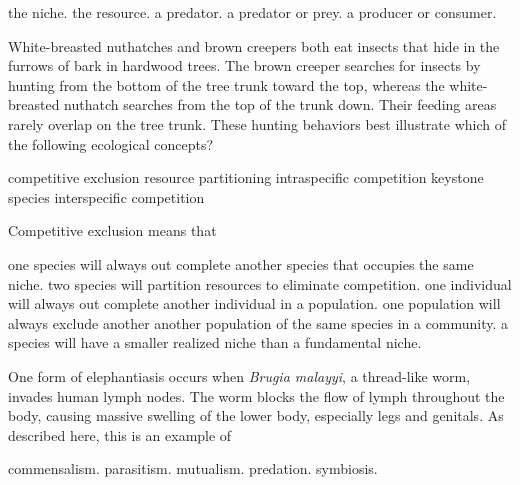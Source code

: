 \begin{choices}
\correctchoice the niche.%
\choice the resource.%
\choice a predator.%
\choice a predator or prey.%
\choice a producer or consumer.%
\end{choices}

\question
White-breasted nuthatches and brown creepers both eat insects that hide in the furrows of bark in hardwood trees. The brown creeper searches for insects by hunting from the bottom of the tree trunk toward the top, whereas the white-breasted nuthatch searches from the top of the trunk down. Their feeding areas rarely overlap on the tree trunk. These hunting behaviors best illustrate which of the following ecological concepts?

\begin{choices}
\choice competitive exclusion%
\correctchoice resource partitioning%
\choice intraspecific competition%
\choice keystone species%
\choice interspecific competition%
\end{choices}



\question
Competitive exclusion means that

\begin{choices}
\correctchoice one species will always out complete another species that occupies the same niche.  %
\choice two species will partition resources to eliminate competition. %
\choice one individual will always out complete another individual in a population. %
\choice one population will always exclude another another population of the same species in a community. %
\choice a species will have a smaller realized niche than a fundamental niche. %
\end{choices}

\question
One form of elephantiasis occurs when \textit{Brugia malayyi}, a thread-like worm, invades human lymph nodes. The worm blocks the flow of lymph throughout the body, causing massive swelling of the lower body, especially legs and genitals. As described here, this is an example of

\begin{choices}
\choice commensalism.%
\correctchoice parasitism.%
\choice mutualism.%
\choice predation.%
\choice symbiosis.%
\end{choices}



